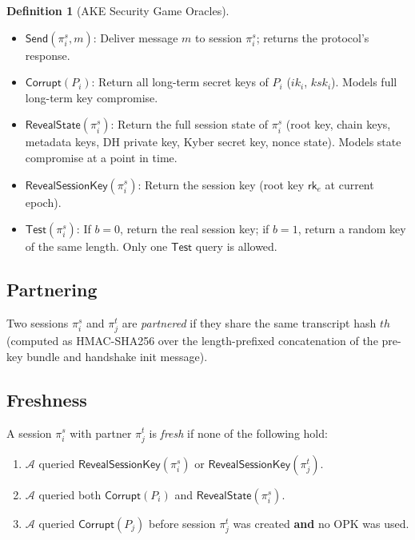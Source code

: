 \documentclass[11pt,a4paper]{article}
\theoremstyle{definition}
\newtheorem{definition}[theorem]{Definition}
\theoremstyle{remark}
\newcommand{\advA}{\mathcal{A}}
\newcommand{\rk}{\mathsf{rk}}
\begin{document}
\begin{definition}[AKE Security Game Oracles]
\label{def:oracles}
\begin{itemize}[nosep]
  \item $\mathsf{Send}(\pi_i^s, m)$: Deliver message $m$ to session $\pi_i^s$;
        returns the protocol's response.
  \item $\mathsf{Corrupt}(P_i)$: Return all long-term secret keys of $P_i$
        ($ik_i$, $\mathit{ksk}_i$). Models full long-term key compromise.
  \item $\mathsf{RevealState}(\pi_i^s)$: Return the full session state of
        $\pi_i^s$ (root key, chain keys, metadata keys, DH private key,
        Kyber secret key, nonce state). Models state compromise at a point in time.
  \item $\mathsf{RevealSessionKey}(\pi_i^s)$: Return the session key
        (root key $\rk_e$ at current epoch).
  \item $\mathsf{Test}(\pi_i^s)$: If $b = 0$, return the real session key;
        if $b = 1$, return a random key of the same length.  Only one
        $\mathsf{Test}$ query is allowed.
\end{itemize}
\end{definition}

\subsection{Partnering}

Two sessions $\pi_i^s$ and $\pi_j^t$ are \emph{partnered} if they share the
same transcript hash $\mathit{th}$ (computed as HMAC-SHA256 over the
length-prefixed concatenation of the pre-key bundle and handshake init message).

\subsection{Freshness}

A session $\pi_i^s$ with partner $\pi_j^t$ is \emph{fresh} if none of the following hold:
\begin{enumerate}[nosep]
  \item $\advA$ queried $\mathsf{RevealSessionKey}(\pi_i^s)$ or
        $\mathsf{RevealSessionKey}(\pi_j^t)$.
  \item $\advA$ queried both $\mathsf{Corrupt}(P_i)$ and
        $\mathsf{RevealState}(\pi_i^s)$.
  \item $\advA$ queried $\mathsf{Corrupt}(P_j)$ before
        session $\pi_j^t$ was created \textbf{and} no OPK was used.
\end{enumerate}
\end{document}
